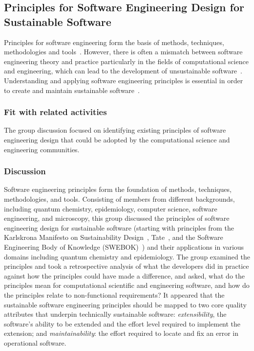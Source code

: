 \subsection{Principles for Software Engineering Design for Sustainable Software} 


Principles for software engineering form the basis of methods, techniques,
methodologies and tools~\cite{Vliet:2008}. However, there is often a mismatch
between software engineering theory and practice particularly in the fields of
computational science and engineering, which can lead to the development of
unsustainable software~\cite{Merali:2010,hettrick:2014}. Understanding and
applying software engineering principles is essential in order to create and
maintain sustainable software~\cite{Becker:2016}.

\subsubsection{Fit with related activities}

The group discussion focused on identifying existing principles of software
engineering design that could be adopted by the computational science and
engineering communities.

\subsubsection{Discussion}

Software engineering principles form the foundation of methods, techniques,
methodologies, and tools.  Consisting of members from different
backgrounds, including quantum chemistry, epidemiology, computer science,
software engineering, and microscopy, this group discussed the principles of software
engineering design for sustainable software (starting with principles from the
Karlskrona Manifesto on Sustainability Design~\cite{Becker:2015},
Tate~\cite{tate:2005}, and the Software Engineering Body of Knowledge
(SWEBOK)~\cite{swebokv3}) and their applications in various domains including
quantum chemistry and epidemiology. The group examined the principles and took a
retrospective analysis of what the developers did in practice against how the
principles could have made a difference, and asked, what do the principles mean
for computational scientific and engineering software, and how do the principles
relate to non-functional requirements? It appeared that the sustainable software
engineering principles should be mapped to two core quality attributes that
underpin technically sustainable software: \emph{extensibility}, the software's ability
to be extended and the effort level required to implement the extension; and
\emph{maintainability}: the effort required to locate and fix an error in operational
software.

